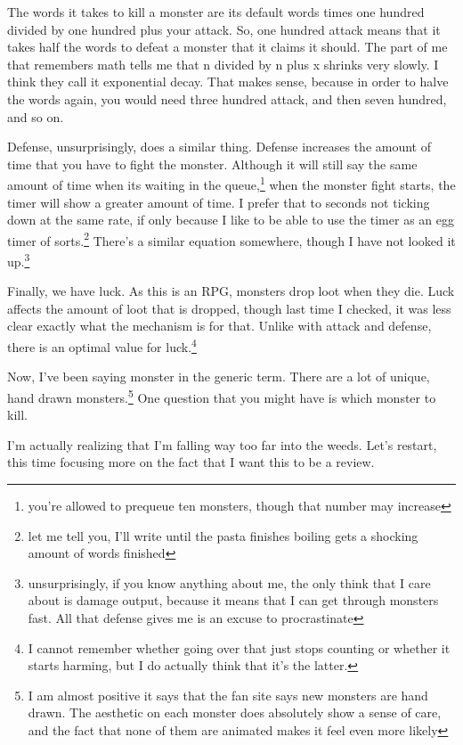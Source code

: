 \documentclass[12pt]{article}[titlepage]
\renewcommand{\,}{\textsuperscript{,}}
\begin{document}
The words it takes to kill a monster are its default words times one hundred divided by one hundred plus your attack.
So, one hundred attack means that it takes half the words to defeat a monster that it claims it should. 
The part of me that remembers math tells me that n divided by n plus x shrinks very slowly. I think they call it exponential decay.
That makes sense, because in order to halve the words again, you would need three hundred attack, and then seven hundred, and so on.

Defense, unsurprisingly, does a similar thing.
Defense increases the amount of time that you have to fight the monster.
Although it will still say the same amount of time when its waiting in the queue,\footnote{you're allowed to prequeue ten monsters, though that number may increase} when the monster fight starts, the timer will show a greater amount of time.
I prefer that to seconds not ticking down at the same rate, if only because I like to be able to use the timer as an egg timer of sorts.\footnote{let me tell you, I'll write until the pasta finishes boiling gets a shocking amount of words finished}
There's a similar equation somewhere, though I have not looked it up.\footnote{unsurprisingly, if you know anything about me, the only think that I care about is damage output, because it means that I can get through monsters fast.
All that defense gives me is an excuse to procrastinate}

Finally, we have luck.
As this is an RPG, monsters drop loot when they die.
Luck affects the amount of loot that is dropped, though last time I checked, it was less clear exactly what the mechanism is for that.
Unlike with attack and defense, there is an optimal value for luck.\footnote{I cannot remember whether going over that just stops counting or whether it starts harming, but I do actually think that it's the latter.}

Now, I've been saying monster in the generic term.
There are a lot of unique, hand drawn monsters.\footnote{I am almost positive it says that the fan site says new monsters are hand drawn. The aesthetic on each monster does absolutely show a sense of care, and the fact that none of them are animated makes it feel even more likely}
One question that you might have is which monster to kill.

I'm actually realizing that I'm falling way too far into the weeds. Let's restart, this time focusing more on the fact that I want this to be a review.
\end{document}
